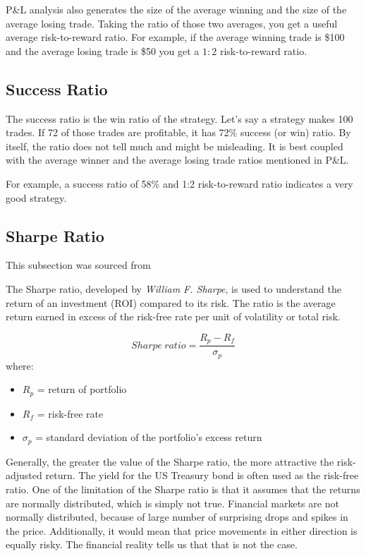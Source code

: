 P\&L analysis also generates the size of the average winning and the size of the average losing trade. Taking the ratio of those two averages, you get a useful average risk-to-reward ratio. For example, if the average winning trade is \$100 and the average losing trade is \$50 you get a $1:2$ risk-to-reward ratio.

\subsection*{Success Ratio}
The success ratio is the win ratio of the strategy. Let's say a strategy makes 100 trades. If 72 of those trades are profitable, it has 72\% success (or win) ratio. By itself, the ratio does not tell much and might be misleading. It is best coupled with the average winner and the average losing trade ratios mentioned in P\&L.

For example, a success ratio of 58\% and 1:2 risk-to-reward ratio indicates a very good strategy.

\subsection*{Sharpe Ratio}
This subsection was sourced from~\cite{investopedia:sharpe-ratio}

The Sharpe ratio, developed by \emph{William F. Sharpe}, is used to understand the return of an investment (ROI) compared to its risk. The ratio is the average return earned in excess of the risk-free rate per unit of volatility or total risk.

$$Sharpe\ ratio = \frac{R_p - R_f}{\sigma _p}$$
where:
\begin{itemize}
    \item $R_p$ = return of portfolio
    \item $R_f$ = risk-free rate
    \item $\sigma_p$ = standard deviation of the portfolio's excess return
\end{itemize}

Generally, the greater the value of the Sharpe ratio, the more attractive the risk-adjusted return. The yield for the US Treasury bond is often used as the risk-free ratio. One of the limitation of the Sharpe ratio is that it assumes that the returns are normally distributed, which is simply not true. Financial markets are not normally distributed, because of large number of surprising drops and spikes in the price. Additionally, it would mean that price movements in either direction is equally risky. The financial reality tells us that that is not the case.

